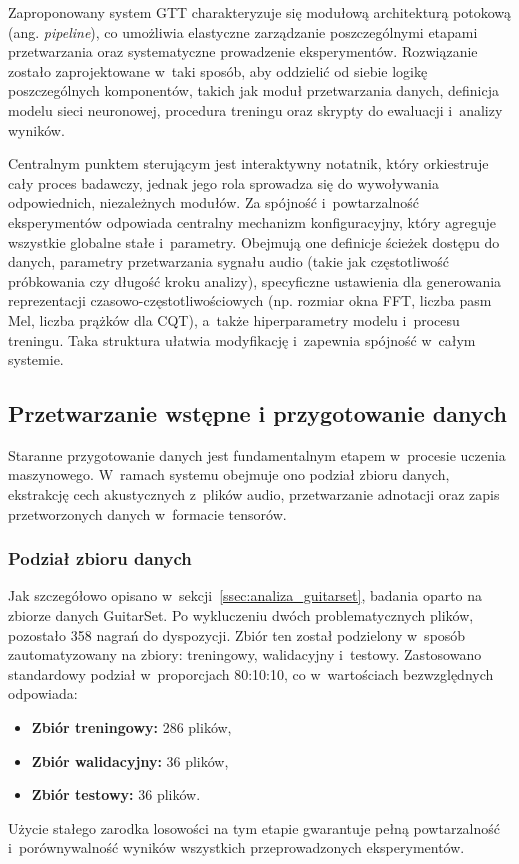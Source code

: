 Zaproponowany system GTT charakteryzuje się modułową architekturą potokową (ang. \textit{pipeline}), co umożliwia elastyczne zarządzanie poszczególnymi etapami przetwarzania oraz systematyczne prowadzenie eksperymentów. Rozwiązanie zostało zaprojektowane w~taki sposób, aby oddzielić od siebie logikę poszczególnych komponentów, takich jak moduł przetwarzania danych, definicja modelu sieci neuronowej, procedura treningu oraz skrypty do ewaluacji i~analizy wyników.

Centralnym punktem sterującym jest interaktywny notatnik, który orkiestruje cały proces badawczy, jednak jego rola sprowadza się do wywoływania odpowiednich, niezależnych modułów. Za spójność i~powtarzalność eksperymentów odpowiada centralny mechanizm konfiguracyjny, który agreguje wszystkie globalne stałe i~parametry. Obejmują one definicje ścieżek dostępu do danych, parametry przetwarzania sygnału audio (takie jak częstotliwość próbkowania czy długość kroku analizy), specyficzne ustawienia dla generowania reprezentacji czasowo-częstotliwościowych (np. rozmiar okna FFT, liczba pasm Mel, liczba prążków dla CQT), a~także hiperparametry modelu i~procesu treningu. Taka struktura ułatwia modyfikację i~zapewnia spójność w~całym systemie.

\subsection{Przetwarzanie wstępne i przygotowanie danych}
\label{ssec:przetwarzanie_wstepne_dane}

Staranne przygotowanie danych jest fundamentalnym etapem w~procesie uczenia maszynowego. W~ramach systemu obejmuje ono podział zbioru danych, ekstrakcję cech akustycznych z~plików audio, przetwarzanie adnotacji oraz zapis przetworzonych danych w~formacie tensorów.

\subsubsection{Podział zbioru danych}
\label{sssec:podzial_zbioru}

Jak szczegółowo opisano w~sekcji~\ref{ssec:analiza_guitarset}, badania oparto na zbiorze danych GuitarSet. Po wykluczeniu dwóch problematycznych plików, pozostało 358 nagrań do dyspozycji. Zbiór ten został podzielony w~sposób zautomatyzowany na zbiory: treningowy, walidacyjny i~testowy. Zastosowano standardowy podział w~proporcjach 80:10:10, co w~wartościach bezwzględnych odpowiada:
\begin{itemize}
    \item \textbf{Zbiór treningowy:} 286 plików,
    \item \textbf{Zbiór walidacyjny:} 36 plików,
    \item \textbf{Zbiór testowy:} 36 plików.
\end{itemize}
Użycie stałego zarodka losowości na tym etapie gwarantuje pełną powtarzalność i~porównywalność wyników wszystkich przeprowadzonych eksperymentów.

